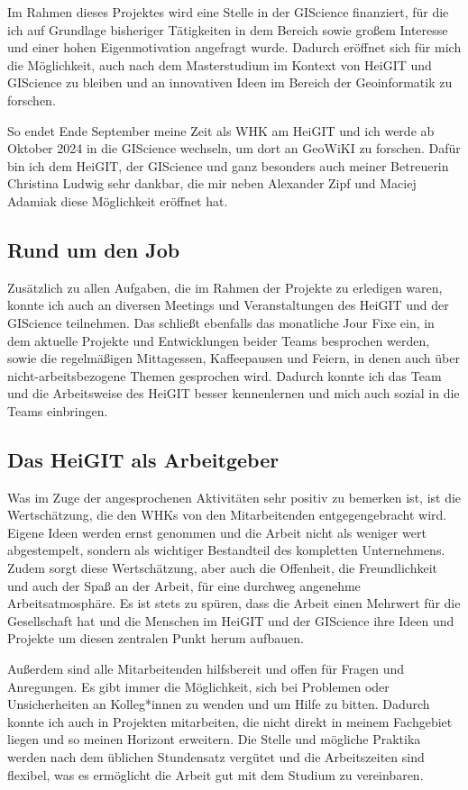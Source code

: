 \documentclass[11pt]{article}
\begin{document}
Im Rahmen dieses Projektes wird eine Stelle in der GIScience finanziert, für die ich auf Grundlage bisheriger Tätigkeiten in dem Bereich sowie großem Interesse und einer hohen Eigenmotivation angefragt wurde. Dadurch eröffnet sich für mich die Möglichkeit, auch nach dem Masterstudium im Kontext von HeiGIT und GIScience zu bleiben und an innovativen Ideen im Bereich der Geoinformatik zu forschen.

So endet Ende September meine Zeit als WHK am HeiGIT und ich werde ab Oktober 2024 in die GIScience wechseln, um dort an GeoWiKI zu forschen. Dafür bin ich dem HeiGIT, der GIScience und ganz besonders auch meiner Betreuerin Christina Ludwig sehr dankbar, die mir neben Alexander Zipf und Maciej Adamiak diese Möglichkeit eröffnet hat.

\subsection{Rund um den Job}

Zusätzlich zu allen Aufgaben, die im Rahmen der Projekte zu erledigen waren, konnte ich auch an diversen Meetings und Veranstaltungen des HeiGIT und der GIScience teilnehmen. Das schließt ebenfalls das monatliche Jour Fixe ein, in dem aktuelle Projekte und Entwicklungen beider Teams besprochen werden, sowie die regelmäßigen Mittagessen, Kaffeepausen und Feiern, in denen auch über nicht-arbeitsbezogene Themen gesprochen wird. Dadurch konnte ich das Team und die Arbeitsweise des HeiGIT besser kennenlernen und mich auch sozial in die Teams einbringen. 

\subsection{Das HeiGIT als Arbeitgeber}

Was im Zuge der angesprochenen Aktivitäten sehr positiv zu bemerken ist, ist die Wertschätzung, die den WHKs von den Mitarbeitenden entgegengebracht wird. Eigene Ideen werden ernst genommen und die Arbeit nicht als weniger wert abgestempelt, sondern als wichtiger Bestandteil des kompletten Unternehmens. Zudem sorgt diese Wertschätzung, aber auch die Offenheit, die Freundlichkeit und auch der Spaß an der Arbeit, für eine durchweg angenehme Arbeitsatmosphäre. Es ist stets zu spüren, dass die Arbeit einen Mehrwert für die Gesellschaft hat und die Menschen im HeiGIT und der GIScience ihre Ideen und Projekte um diesen zentralen Punkt herum aufbauen.

Außerdem sind alle Mitarbeitenden hilfsbereit und offen für Fragen und Anregungen. Es gibt immer die Möglichkeit, sich bei Problemen oder Unsicherheiten an Kolleg*innen zu wenden und um Hilfe zu bitten. Dadurch konnte ich auch in Projekten mitarbeiten, die nicht direkt in meinem Fachgebiet liegen und so meinen Horizont erweitern. Die Stelle und mögliche Praktika werden nach dem üblichen Stundensatz vergütet und die Arbeitszeiten sind flexibel, was es ermöglicht die Arbeit gut mit dem Studium zu vereinbaren.
\end{document}
